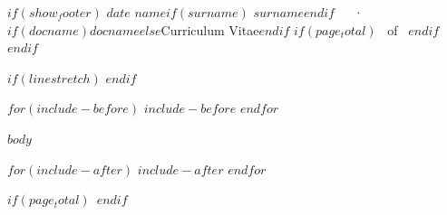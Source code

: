 \documentclass[$if(fontsize)$$fontsize$$else$11pt$endif$,$if(lang)$$babel-lang$,$endif$$if(papersize)$$papersize$$else$a4paper$endif$,$for(classoption)$$classoption$$sep$,$endfor$]{crisp}
\begin{document}
\makecvheader

$if(show_footer)$
\makecvfooter
  {$date$}
    {$name$$if(surname)$ $surname$$endif$~~~·~~~$if(docname)$$docname$$else$Curriculum Vitae$endif$}
  {\thepage$if(page_total)$~ of \pageref{LastPage}~$endif$}
$endif$



$if(linestretch)$
$endif$

$for(include-before)$
$include-before$
$endfor$

$body$

$for(include-after)$
$include-after$
$endfor$

$if(page_total)$\label{LastPage}~$endif$
\end{document}
